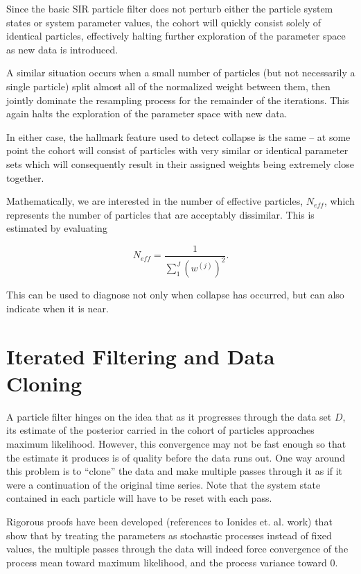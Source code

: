 \documentclass[12pt]{article}
\begin{document}
	Since the basic SIR particle filter does not perturb either the particle system states or system parameter values, the cohort will quickly consist solely of identical particles, effectively halting further exploration of the parameter space as new data is introduced.

	A similar situation occurs when a small number of particles (but not necessarily a single particle) split almost all of the normalized weight between them, then jointly dominate the resampling process for the remainder of the iterations. This again halts the exploration of the parameter space with new data.

	In either case, the hallmark feature used to detect collapse is the same -- at some point the cohort will consist of particles with very similar or identical parameter sets which will consequently result in their assigned weights being extremely close together.

	Mathematically, we are interested in the number of effective particles, $N_{eff}$, which represents the number of particles that are acceptably dissimilar. This is estimated by evaluating

	\begin{equation}
		N_{eff} = \frac{1}{\sum_1^J (w^{(j)})^2}.
	\end{equation}

	This can be used to diagnose not only when collapse has occurred, but can also indicate when it is near.

\section{Iterated Filtering and Data Cloning}

	A particle filter hinges on the idea that as it progresses through the data set $D$, its estimate of the posterior carried in the cohort of particles approaches maximum likelihood. However, this convergence may not be fast enough so that the estimate it produces is of quality before the data runs out. One way around this problem is to ``clone'' the data and make multiple passes through it as if it were a continuation of the original time series. Note that the system state contained in each particle will have to be reset with each pass.

	Rigorous proofs have been developed (references to Ionides et. al. work) that show that by treating the parameters as stochastic processes instead of fixed values, the multiple passes through the data will indeed force convergence of the process mean toward maximum likelihood, and the process variance toward 0.
\end{document}
